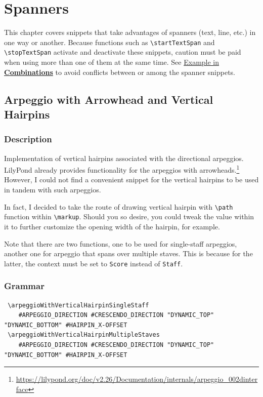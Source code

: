 
\chapter {Spanners}

This chapter covers snippets that take advantages of spanners (text, line, etc.) in one way or another. Because functions such as \verb|\startTextSpan| and \verb|\stopTextSpan| activate and deactivate these snippets, caution must be paid when using more than one of them at the same time. See \hyperref[sec:comb_spanners]{Example in \textbf{Combinations}} to avoid conflicts between or among the spanner snippets.
\clearpage



\section {Arpeggio with Arrowhead and Vertical Hairpins}
\label{sec:arpeggioArrowheadVerticalHairpin}
\hfill

\subsection{Description}
Implementation of vertical hairpins associated with the directional arpeggios. LilyPond already provides functionality for the arpeggios with arrowheads.\footnote{\url{https://lilypond.org/doc/v2.26/Documentation/internals/arpeggio_002dinterface}} However, I could not find a convenient snippet for the vertical hairpins to be used in tandem with such arpeggios. 

In fact, I decided to take the route of drawing vertical hairpin with \verb|\path| function within \verb|\markup|. Should you so desire, you could tweak the value within it to further customize the opening width of the hairpin, for example. 

Note that there are two functions, one to be used for single-staff arpeggios, another one for arpeggio that spans over multiple staves. This is because for the latter, the context must be set to \Verb|Score| instead of \Verb|Staff|. 

\subsection{Grammar}

\begin{verbatim}
 \arpeggioWithVerticalHairpinSingleStaff 
 	#ARPEGGIO_DIRECTION #CRESCENDO_DIRECTION "DYNAMIC_TOP" "DYNAMIC_BOTTOM" #HAIRPIN_X-OFFSET
 \arpeggioWithVerticalHairpinMultipleStaves 
 	#ARPEGGIO_DIRECTION #CRESCENDO_DIRECTION "DYNAMIC_TOP" "DYNAMIC_BOTTOM" #HAIRPIN_X-OFFSET 
\end{verbatim}

